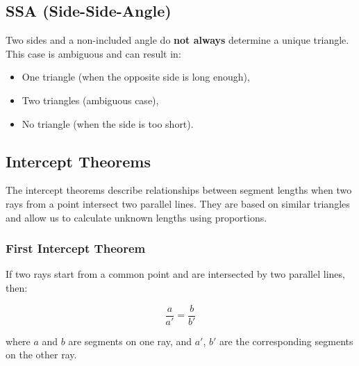 \subsection{SSA (Side-Side-Angle)}
Two sides and a non-included angle do \textbf{not always} determine a unique triangle. This case is ambiguous and can result in:
\begin{itemize}
    \item One triangle (when the opposite side is long enough),
    \item Two triangles (ambiguous case),
    \item No triangle (when the side is too short).
\end{itemize}
\begin{center}
\end{center}

\subsection{Intercept Theorems}

The intercept theorems describe relationships between segment lengths when two rays from a point intersect two parallel lines. They are based on similar triangles and allow us to calculate unknown lengths using proportions.

\subsubsection{First Intercept Theorem}

If two rays start from a common point and are intersected by two parallel lines, then:

\[
	\frac{a}{a'} = \frac{b}{b'}
\]

\noindent where \(a\) and \(b\) are segments on one ray, and \(a'\), \(b'\) are the corresponding segments on the other ray.

